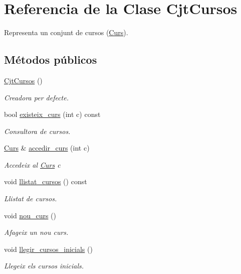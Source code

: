 \hypertarget{class_cjt_cursos}{}\section{Referencia de la Clase Cjt\+Cursos}
\label{class_cjt_cursos}


Representa un conjunt de cursos (\mbox{\hyperlink{class_curs}{Curs}}).  


\subsection*{Métodos públicos}
\begin{DoxyCompactItemize}
\item 
\mbox{\hyperlink{class_cjt_cursos_a0d8729229189d748a8c62033277268ba}{Cjt\+Cursos}} ()
\begin{DoxyCompactList}\small\item\em Creadora per defecte. \end{DoxyCompactList}\item 
bool \mbox{\hyperlink{class_cjt_cursos_ad12b1174de2a5f09cb0c2558645d74dc}{existeix\+\_\+curs}} (int c) const
\begin{DoxyCompactList}\small\item\em Consultora de cursos. \end{DoxyCompactList}\item 
\mbox{\hyperlink{class_curs}{Curs}} \& \mbox{\hyperlink{class_cjt_cursos_aaff9556e6d0f2b55e74fb757ffd51e42}{accedir\+\_\+curs}} (int c)
\begin{DoxyCompactList}\small\item\em Accedeix al \mbox{\hyperlink{class_curs}{Curs}} {\itshape c} \end{DoxyCompactList}\item 
void \mbox{\hyperlink{class_cjt_cursos_a9a772bfad772e507fa9b8f5194b13873}{llistat\+\_\+cursos}} () const
\begin{DoxyCompactList}\small\item\em Llistat de cursos. \end{DoxyCompactList}\item 
void \mbox{\hyperlink{class_cjt_cursos_a3d4778b4572a99e1109d6376f439255e}{nou\+\_\+curs}} ()
\begin{DoxyCompactList}\small\item\em Afageix un nou curs. \end{DoxyCompactList}\item 
void \mbox{\hyperlink{class_cjt_cursos_a970aa3d7caa26ed983ccd71e4bfd0adf}{llegir\+\_\+cursos\+\_\+inicials}} ()
\begin{DoxyCompactList}\small\item\em Llegeix els cursos inicials. \end{DoxyCompactList}\end{DoxyCompactItemize}


